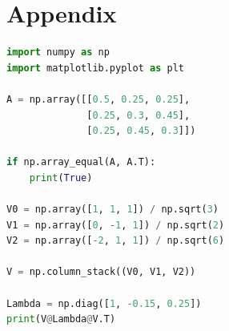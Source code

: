 \documentclass[12pt]{article}
\begin{document}
\section*{Appendix}
\begin{lstlisting}[language = Python]
import numpy as np
import matplotlib.pyplot as plt

A = np.array([[0.5, 0.25, 0.25], 
              [0.25, 0.3, 0.45],
              [0.25, 0.45, 0.3]])

if np.array_equal(A, A.T):
    print(True)

V0 = np.array([1, 1, 1]) / np.sqrt(3)
V1 = np.array([0, -1, 1]) / np.sqrt(2)
V2 = np.array([-2, 1, 1]) / np.sqrt(6)

V = np.column_stack((V0, V1, V2))

Lambda = np.diag([1, -0.15, 0.25])
print(V@Lambda@V.T)
\end{lstlisting}
\printbibliography
\end{document}
